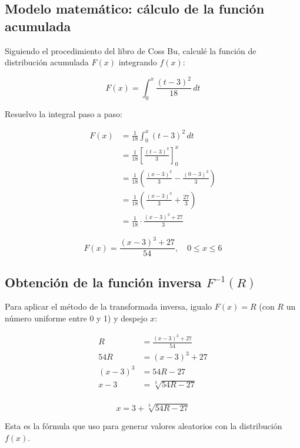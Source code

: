 \documentclass[12pt,a4paper]{article}
\begin{document}
\subsection{Modelo matemático: cálculo de la función acumulada}

Siguiendo el procedimiento del libro de Coss Bu, calculé la función de distribución acumulada $F(x)$ integrando $f(x)$:

\[
F(x) = \int_0^x \frac{(t-3)^2}{18}\, dt
\]

Resuelvo la integral paso a paso:

\begin{align*}
F(x) &= \frac{1}{18} \int_0^x (t-3)^2\, dt \\[4pt]
     &= \frac{1}{18} \left[\frac{(t-3)^3}{3}\right]_0^x \\[4pt]
     &= \frac{1}{18} \left(\frac{(x-3)^3}{3} - \frac{(0-3)^3}{3}\right) \\[4pt]
     &= \frac{1}{18} \left(\frac{(x-3)^3}{3} + \frac{27}{3}\right) \\[4pt]
     &= \frac{1}{18} \cdot \frac{(x-3)^3 + 27}{3}
\end{align*}

\begin{formulabox}
\[
\boxed{F(x) = \frac{(x-3)^3 + 27}{54}}, \quad 0 \leq x \leq 6
\]
\end{formulabox}

\subsection{Obtención de la función inversa $F^{-1}(R)$}

Para aplicar el método de la transformada inversa, igualo $F(x) = R$ (con $R$ un número uniforme entre 0 y 1) y despejo $x$:

\begin{align*}
R &= \frac{(x-3)^3 + 27}{54} \\[4pt]
54R &= (x-3)^3 + 27 \\[4pt]
(x-3)^3 &= 54R - 27 \\[4pt]
x - 3 &= \sqrt[3]{54R - 27} \\[4pt]
\end{align*}

\begin{formulabox}
\[
\boxed{x = 3 + \sqrt[3]{54R - 27}}
\]

Esta es la fórmula que uso para generar valores aleatorios con la distribución $f(x)$.
\end{formulabox}
\end{document}
